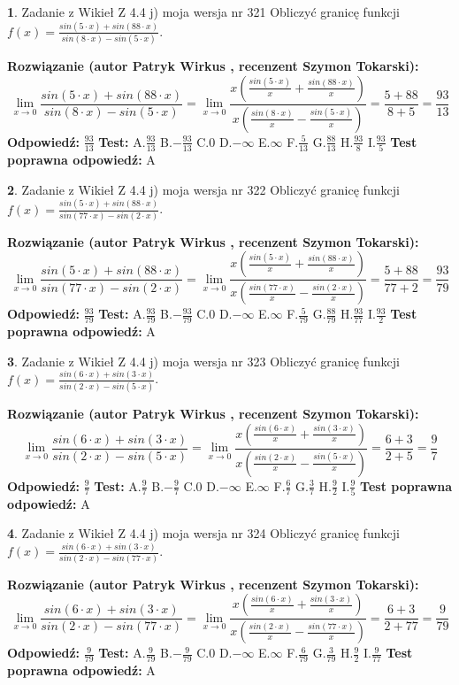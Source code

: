 \documentclass[12pt, a4paper]{article}
\theoremstyle{definition} %
\newtheorem{zad}{}
\newcommand{\zadStart}[1]{\begin{zad}#1\newline}
\newcommand{\zadStop}{\end{zad}}
\newcommand{\rozwStart}[2]{\noindent \textbf{Rozwiązanie (autor #1 , recenzent #2): }\newline}
\newcommand{\rozwStop}{\newline}
\newcommand{\odpStart}{\noindent \textbf{Odpowiedź:}\newline}
\newcommand{\odpStop}{\newline}
\newcommand{\testStart}{\noindent \textbf{Test:}\newline}
\newcommand{\testStop}{\newline}
\newcommand{\kluczStart}{\noindent \textbf{Test poprawna odpowiedź:}\newline}
\newcommand{\kluczStop}{\newline}
\begin{document}
\zadStart{Zadanie z Wikieł Z 4.4 j) moja wersja nr 321}
Obliczyć granicę funkcji $f(x)=\frac{sin(5\cdot x) +sin(88\cdot x)}{sin(8\cdot x) -sin(5\cdot x)}$.
\zadStop
\rozwStart{Patryk Wirkus}{Szymon Tokarski}
$$\lim\limits_{x\to 0}\frac{sin(5\cdot x) +sin(88\cdot x)}{sin(8\cdot x) -sin(5\cdot x)}=\lim\limits_{x\to 0}\frac{x(\frac{sin(5\cdot x)}{x}+\frac{sin(88\cdot x)}{x})}{x(\frac{sin(8\cdot x)}{x}-\frac{sin(5\cdot x)}{x})}=\frac{5+88}{8+5} = \frac{93}{13}$$
\rozwStop
\odpStart
$\frac{93}{13}$
\odpStop
\testStart
A.$\frac{93}{13}$
B.$-\frac{93}{13}$
C.$0$
D.$-\infty$
E.$\infty$
F.$\frac{5}{13}$
G.$\frac{88}{13}$
H.$\frac{93}{8}$
I.$\frac{93}{5}$
\testStop
\kluczStart
A
\kluczStop



\zadStart{Zadanie z Wikieł Z 4.4 j) moja wersja nr 322}
Obliczyć granicę funkcji $f(x)=\frac{sin(5\cdot x) +sin(88\cdot x)}{sin(77\cdot x) -sin(2\cdot x)}$.
\zadStop
\rozwStart{Patryk Wirkus}{Szymon Tokarski}
$$\lim\limits_{x\to 0}\frac{sin(5\cdot x) +sin(88\cdot x)}{sin(77\cdot x) -sin(2\cdot x)}=\lim\limits_{x\to 0}\frac{x(\frac{sin(5\cdot x)}{x}+\frac{sin(88\cdot x)}{x})}{x(\frac{sin(77\cdot x)}{x}-\frac{sin(2\cdot x)}{x})}=\frac{5+88}{77+2} = \frac{93}{79}$$
\rozwStop
\odpStart
$\frac{93}{79}$
\odpStop
\testStart
A.$\frac{93}{79}$
B.$-\frac{93}{79}$
C.$0$
D.$-\infty$
E.$\infty$
F.$\frac{5}{79}$
G.$\frac{88}{79}$
H.$\frac{93}{77}$
I.$\frac{93}{2}$
\testStop
\kluczStart
A
\kluczStop



\zadStart{Zadanie z Wikieł Z 4.4 j) moja wersja nr 323}
Obliczyć granicę funkcji $f(x)=\frac{sin(6\cdot x) +sin(3\cdot x)}{sin(2\cdot x) -sin(5\cdot x)}$.
\zadStop
\rozwStart{Patryk Wirkus}{Szymon Tokarski}
$$\lim\limits_{x\to 0}\frac{sin(6\cdot x) +sin(3\cdot x)}{sin(2\cdot x) -sin(5\cdot x)}=\lim\limits_{x\to 0}\frac{x(\frac{sin(6\cdot x)}{x}+\frac{sin(3\cdot x)}{x})}{x(\frac{sin(2\cdot x)}{x}-\frac{sin(5\cdot x)}{x})}=\frac{6+3}{2+5} = \frac{9}{7}$$
\rozwStop
\odpStart
$\frac{9}{7}$
\odpStop
\testStart
A.$\frac{9}{7}$
B.$-\frac{9}{7}$
C.$0$
D.$-\infty$
E.$\infty$
F.$\frac{6}{7}$
G.$\frac{3}{7}$
H.$\frac{9}{2}$
I.$\frac{9}{5}$
\testStop
\kluczStart
A
\kluczStop



\zadStart{Zadanie z Wikieł Z 4.4 j) moja wersja nr 324}
Obliczyć granicę funkcji $f(x)=\frac{sin(6\cdot x) +sin(3\cdot x)}{sin(2\cdot x) -sin(77\cdot x)}$.
\zadStop
\rozwStart{Patryk Wirkus}{Szymon Tokarski}
$$\lim\limits_{x\to 0}\frac{sin(6\cdot x) +sin(3\cdot x)}{sin(2\cdot x) -sin(77\cdot x)}=\lim\limits_{x\to 0}\frac{x(\frac{sin(6\cdot x)}{x}+\frac{sin(3\cdot x)}{x})}{x(\frac{sin(2\cdot x)}{x}-\frac{sin(77\cdot x)}{x})}=\frac{6+3}{2+77} = \frac{9}{79}$$
\rozwStop
\odpStart
$\frac{9}{79}$
\odpStop
\testStart
A.$\frac{9}{79}$
B.$-\frac{9}{79}$
C.$0$
D.$-\infty$
E.$\infty$
F.$\frac{6}{79}$
G.$\frac{3}{79}$
H.$\frac{9}{2}$
I.$\frac{9}{77}$
\testStop
\kluczStart
A
\kluczStop
\end{document}
